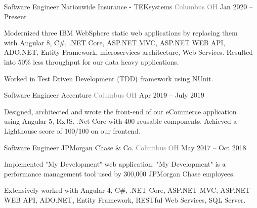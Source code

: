 \vspace{-2mm}
\begin{cventries}
    \vspace{-1mm}  \cventry
    {Software Engineer}
    {\hspace*{0.5mm}\bullet \hspace*{0.5mm} Nationwide Insurance - TEKsystems }
    {\textcolor{graytext}{Columbus OH}}
    {Jan 2020 – Present}
    {\begin{cvitems}\item {Modernized three IBM WebSphere static web applications by replacing them with Angular 8, C\#, .NET Core, ASP.NET MVC, ASP.NET WEB API, ADO.NET, Entity Framework, microservices architecture, Web Services. Resulted into 50\% less throughput for our data heavy applications.}  \item {Worked in Test Driven Development (TDD) framework using NUnit.}\end{cvitems}   \vspace{-1mm}   
    }
\cventry
    {Software Engineer}
    {\hspace*{0.5mm}\bullet \hspace*{0.5mm} Accenture}
    {\textcolor{graytext}{Columbus OH}}
    {Apr 2019 – July 2019}
    {\begin{cvitems}\item {Designed, architected and wrote the front-end of our eCommerce application using Angular 5, RxJS, .Net Core with 400 reusable components. Achieved a Lighthouse score of 100/100 on our frontend.}
\end{cvitems}   \vspace{-1mm}   
    }   
\cventry
    {Software Engineer}
    {\hspace*{0.5mm}\bullet \hspace*{0.5mm} JPMorgan Chase \& Co.}
    {\textcolor{graytext}{Columbus OH}}
    {May 2017 – Oct 2018}
    {\begin{cvitems}\item {Implemented "My Development" web application. "My Development" is a performance management tool used by 300,000 JPMorgan Chase employees.}\item {Extensively worked with Angular 4, C\#, .NET Core, ASP.NET MVC, ASP.NET WEB API, ADO.NET, Entity Framework, RESTful Web Services, SQL Server.}\end{cvitems}
    }   
\end{cventries}
